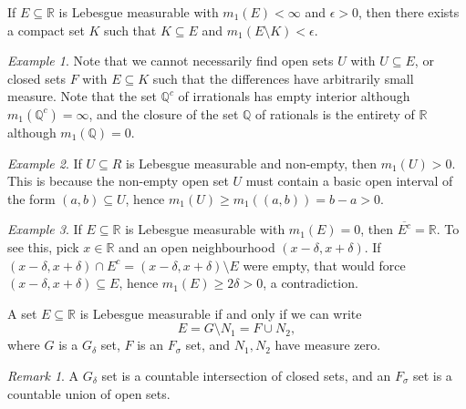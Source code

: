 \documentclass[11pt]{article}
\newcommand{\R}{\mathbb{R}}
\newcommand{\Q}{\mathbb{Q}}
\theoremstyle{definition}
\theoremstyle{remark}
\newtheorem*{remark}{Remark}
\newtheorem*{example}{Example}
\numberwithin{equation}{section}
\begin{document}
    \begin{corollary}
        If $E \subseteq \R$ is Lebesgue measurable with $m_1(E) < \infty$ and
        $\epsilon > 0$, then there exists a compact set $K$ such that $K \subseteq E$
        and $m_1(E \setminus K) < \epsilon$.
    \end{corollary}

    \begin{example}
        Note that we cannot necessarily find open sets $U$ with $U \subseteq E$, or
        closed sets $F$ with $E \subseteq K$ such that the differences have
        arbitrarily small measure. Note that the set $\Q^c$ of irrationals has empty
        interior although $m_1(\Q^c) = \infty$, and the closure of the set $\Q$ of
        rationals is the entirety of $\R$ although $m_1(\Q) = 0$.
    \end{example}

    \begin{example}
        If $U \subseteq R$ is Lebesgue measurable and non-empty, then $m_1(U) > 0$.
        This is because the non-empty open set $U$ must contain a basic open interval
        of the form $(a, b) \subseteq U$, hence $m_1(U) \geq m_1((a, b)) = b - a >
        0$.
    \end{example}

    \begin{example}
        If $E \subseteq \R$ is Lebesgue measurable with $m_1(E) = 0$, then
        $\overline{E^c} = \R$. To see this, pick $x \in \R$ and an open neighbourhood
        $(x - \delta, x + \delta)$. If $(x - \delta, x + \delta) \cap E^c = (x -
        \delta, x + \delta)\setminus E$ were empty, that would force $(x - \delta, x
        + \delta) \subseteq E$, hence $m_1(E) \geq 2\delta > 0$, a contradiction.
    \end{example}

    \begin{theorem}
        A set $E \subseteq \R$ is Lebesgue measurable if and only if we can write \[
            E = G \setminus N_1 = F \cup N_2,
        \] where $G$ is a $G_\delta$ set, $F$ is an $F_\sigma$ set, and $N_1, N_2$
        have measure zero.

        \begin{remark}
            A $G_\delta$ set is a countable intersection of closed sets, and an
            $F_\sigma$ set is a countable union of open sets.
        \end{remark}
    \end{theorem}
\end{document}

